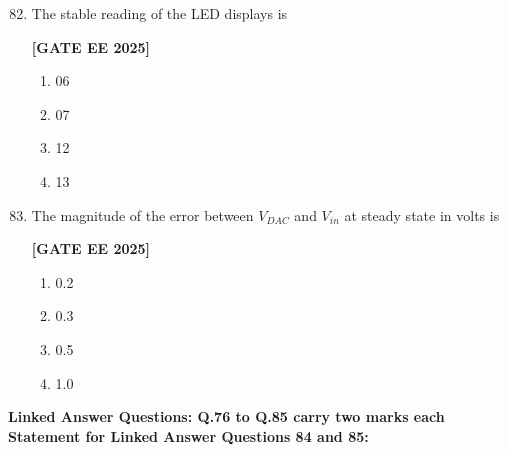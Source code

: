 \documentclass[12pt]{article}
\begin{document}
\begin{enumerate}[leftmargin=*, label=\textbf{Q.\arabic*:}]
\setcounter{enumi}{81}

\item The stable reading of the LED displays is
 
\noindent \textbf{[GATE EE 2025]}
\begin{enumerate}
  \item 06
  \item 07
  \item 12
  \item 13
\end{enumerate}

\item The magnitude of the error between $V_{DAC}$ and $V_{in}$ at steady state in volts is
 
\noindent \textbf{[GATE EE 2025]}
\begin{enumerate}
  \item 0.2
  \item 0.3
  \item 0.5
  \item 1.0
\end{enumerate}

\end{enumerate}


 \large \textbf {Linked Answer Questions: Q.76 to Q.85 carry two marks each}
 \large \textbf {Statement for Linked Answer Questions 84 and 85: }
\end{document}
